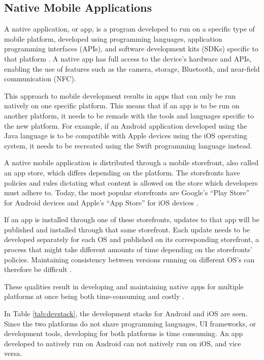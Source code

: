 \documentclass[a4paper,12pt]{article}
\begin{document}
\subsection{Native Mobile Applications}
\label{Theory_nativeApps}
A native application, or app, is a program developed to run on a specific type of mobile platform, developed using programming languages, application programming interfaces (APIs), and software development kits (SDKs) specific to that platform \cite{crossplatform_taxonomy, mobile_web_apps_2013}. A native app has full access to the device’s hardware and APIs, enabling the use of features such as the camera, storage, Bluetooth, and near-field communication (NFC).

This approach to mobile development results in apps that can only be run natively on one specific platform. This means that if an app is to be run on another platform, it needs to be remade with the tools and languages specific to the new platform. For example, if an Android application developed using the Java language is to be compatible with Apple devices using the iOS operating system, it needs to be recreated using the Swift programming language instead.

A native mobile application is distributed through a mobile storefront, also called an app store, which differs depending on the platform. The storefronts have policies and rules dictating what content is allowed on the store which developers must adhere to. Today, the most popular storefronts are  Google’s “Play Store” for Android devices and Apple’s “App Store” for iOS devices \cite{numofapps_in_stores}.

If an app is installed through one of these storefronts, updates to that app will be published and installed through that same storefront. Each update needs to be developed separately for each OS and published on its corresponding storefront, a process that might take different amounts of time depending on the storefronts’ policies. Maintaining consistency between versions running on different OS’s can therefore be difficult \cite{comp_mobile_apps_crossplatform}.

These qualities result in developing and maintaining native apps for multiple platforms at once being both time-consuming and costly \cite{mobile_web_apps_2013}.

In Table \ref{tab:devstack}, the development stacks for Android and iOS are seen. Since the two platforms do not share programming languages, UI frameworks, or development tools, developing for both platforms is time consuming. An app developed to natively run on Android can not natively run on iOS, and vice versa.
\end{document}
